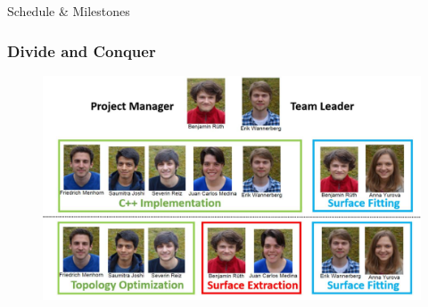\begin{frame}{Schedule \& Milestones}
\begin{overlayarea}{\textwidth}{.1 \textheight}
\textbf{}
\end{overlayarea}
\begin{overlayarea}{\textwidth}{.9 \textheight}
\begin{figure}
\end{figure}
\end{overlayarea}
\end{frame}

\begin{frame}

	\frametitle{Divide and Conquer}

	\begin{figure}
	\includegraphics[scale=0.32]{Pictures/DC/organization.pdf}
	\end{figure}
	
\end{frame}

